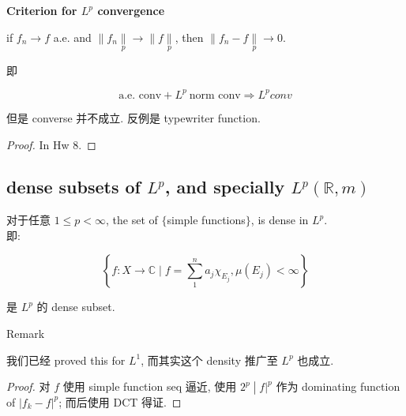 \documentclass{qlnotes-export}
\begin{document}
\begin{theorem}{\protect{}\label{kn-criterion-for-l-p-convergence}{\textbf{Criterion
for \(L^{p}\) convergence}}}

if \(f_{n}\rightarrow f\) a.e. and \(\parallel f_{n}\underset{p}{\parallel}\rightarrow \parallel f\underset{p}{\parallel}\), then \(\parallel f_{n} - f\underset{p}{\parallel}\rightarrow 0\).

\end{theorem}

即

\[\text{a.e. conv} + L^{p}\ \text{norm conv}\Longrightarrow L^{p}conv\]

但是 converse 并不成立. 反例是 typewriter function.

\begin{proof}

In Hw 8.

\end{proof}

\subsection{\texorpdfstring{dense subsets of \(L^{p}\), and specially \(L^{p}({\mathbb{R}},m)\)}{dense subsets of L\^{}\{p\}, and specially L\^{}\{p\}(\{\textbackslash mathbb\{R\}\},m)}}\label{dense-subsets-of-lp-and-specially-lpmathbbrm}

\begin{proposition}

对于任意 \(1 \leq p < \infty\), the set of \(\{\)simple functions\(\}\), is dense in \(L^{p}\).\\
即:

\[\left\{ {f:X\rightarrow{\mathbb{C}} \mid f = \sum\limits_{1}^{n}a_{j}\chi_{E_{j}},\mu(E_{j}) < \infty} \right\}\]

是 \(L^{p}\) 的 dense subset.

\end{proposition}

\begin{qlremark}{Remark}

我们已经 proved this for \(L^{1}\), 而其实这个 density 推广至 \(L^{p}\) 也成立.

\end{qlremark}

\begin{proof}

对 \(f\) 使用 simple function seq 逼近, 使用 \(\left. 2^{p} \middle| f|^{p} \right.\) 作为 dominating function of \(|f_{k} - f|^{p}\); 而后使用 DCT 得证.

\end{proof}
\end{document}
